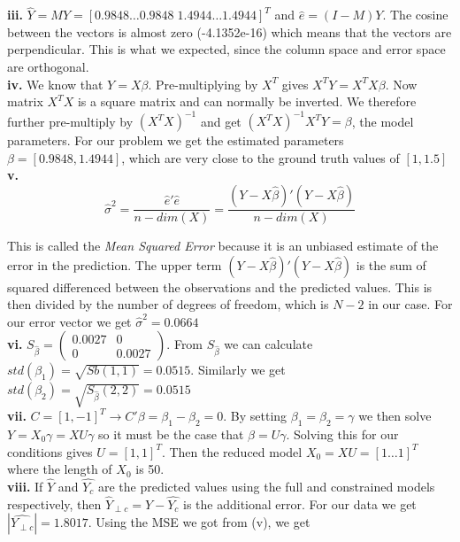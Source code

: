 \documentclass[12pt,a4paper,oneside]{report}
\begin{document}
\textbf{iii.} $\hat{Y} = MY = [ 0.9848 \dots 0.9848 \; 1.4944 \dots 1.4944]^T$ and $\hat{e} = (I-M)Y$. The cosine between the vectors is almost zero (-4.1352e-16) which means that the vectors are perpendicular. This is what we expected, since the column space and error space are orthogonal.\\

\textbf{iv.} We know that $Y = X\beta$. Pre-multiplying by $X^T$ gives $X^TY = X^TX\beta$. Now matrix $X^TX$ is a square matrix and can normally be inverted. We therefore further pre-multiply by $(X^TX)^{-1}$ and get $(X^TX)^{-1}X^TY = \beta$, the model parameters. For our problem we get the estimated parameters $\beta = [0.9848, 1.4944]$, which are very close to the ground truth values of $[1, 1.5]$\\

\textbf{v.} $$\hat{\sigma}^2 = \frac{\hat{e}'\hat{e}}{n - dim(X)} = \frac{(Y - X\hat{\beta})'(Y - X\hat{\beta})}{n - dim(X)}$$

This is called the \emph{Mean Squared Error} because it is an unbiased estimate of the error in the prediction. The upper term $(Y - X\hat{\beta})'(Y - X\hat{\beta})$ is the sum of squared differenced between the observations and the predicted values. This is then divided by the number of degrees of freedom, which is $N - 2$ in our case. For our error vector we get $\hat{\sigma}^2 = 0.0664$\\

\textbf{vi.} $S_{\hat{\beta}} = \begin{pmatrix}
0.0027 & 0\\
0 & 0.0027
\end{pmatrix}$. From $S_{\hat{\beta}}$ we can calculate $std(\beta_1) = \sqrt{Sb(1,1)} = 0.0515$. Similarly we get  $std(\beta_2) = \sqrt{S_{\hat{\beta}}(2,2)} = 0.0515$\\

\textbf{vii.} $C = [1, -1]^T \to C'\beta = \beta_1 - \beta_2 = 0$. By setting $\beta_1 = \beta_2 = \gamma$ we then solve $Y = X_0\gamma = XU\gamma$ so it must be the case that $\beta = U\gamma$. Solving this for our conditions gives $U = [1, 1]^T$. Then the reduced model $X_0 = XU = [1 \dots 1]^T $ where the length of $X_0$ is 50. \\


\textbf{viii.} If $\hat{Y}$ and $\hat{Y_c}$ are the predicted values using the full and constrained models respectively, then $\hat{Y}_{\perp c} = \hat{Y} - \hat{Y_c}$ is the additional error. For our data we get $|\hat{Y_{\perp c}}| = 1.8017$. Using the MSE we got from (v), we get 
\end{document}
